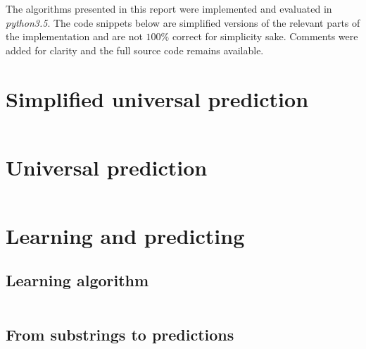 \documentclass[a4paper,12pt]{article}
\begin{document}
\clearpage
\begin{appendices}

  The algorithms presented in this report were implemented and evaluated
  in \emph{python3.5}. The code snippets below are simplified versions of
  the relevant parts of the implementation and are not $100\%$ correct for
  simplicity sake. Comments were added for clarity and the full source code
  remains available.

  \section{Simplified universal prediction}\label{code_simplified}

    \inputminted[linenos]{python}{code/simplified.py}

  \clearpage
  \section{Universal prediction}\label{code_complete}

    \inputminted[linenos]{python}{code/complete.py}

  \clearpage
  \section{Learning and predicting}

  \subsection{Learning algorithm}\label{code_learning}

      \inputminted[linenos]{python}{code/learning.py}

    \clearpage
    \subsection{From substrings to predictions}\label{code_predicting}

      \inputminted[linenos]{python}{code/predicting.py}

\end{appendices}
\end{document}
